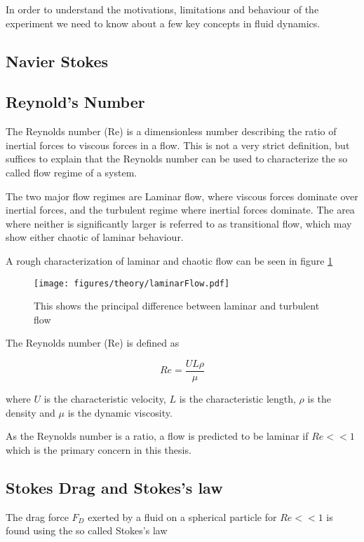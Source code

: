 
In order to understand the motivations, limitations and behaviour of the experiment we need to know about a few key concepts in fluid dynamics.

\subsection{Navier Stokes}


\subsection{Reynold's Number}
The Reynolds number (Re) is a dimensionless number describing the ratio of inertial forces to viscous forces in a flow. This is not a very strict definition, but suffices to explain that the Reynolds number can be used to characterize the so called flow regime of a system. 

The two major flow regimes are Laminar flow, where viscous forces dominate over inertial forces, and the turbulent regime where inertial forces dominate. The area where neither is significantly larger is referred to as transitional flow, which may show either chaotic of laminar behaviour. 

A rough characterization of laminar and chaotic flow can be seen in figure \ref{fig:laminar_flow}

\begin{figure}
\centering
\texttt{[image: figures/theory/laminarFlow.pdf]}
\caption{This shows the principal difference between laminar and turbulent flow}
\label{fig:laminar_flow}
\end{figure}

The Reynolds number (Re) is defined as \cite{introfluid}

\begin{equation}\label{eq:reynolds}
Re = \frac{U L \rho}{\mu}
\end{equation}

where $U$ is the characteristic velocity, $L$ is the characteristic length, $\rho$ is the density and $\mu$ is the dynamic viscosity. 

As the Reynolds number is a ratio, a flow is predicted to be laminar if $Re << 1$ which is the primary concern in this thesis.

\subsection{Stokes Drag and Stokes's law}
The drag force $F_D$ exerted by a fluid on a spherical particle for $Re << 1$ is found using the so called Stokes's law \cite{introfluid2}

